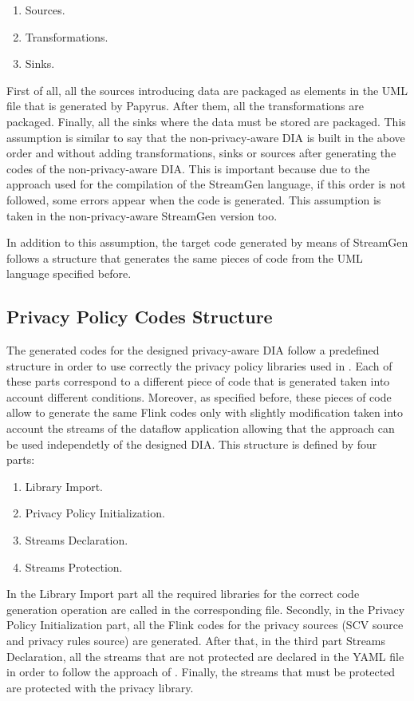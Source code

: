 \begin{enumerate}
\item Sources.
\item Transformations.
\item Sinks.
\end{enumerate}

First of all, all the sources introducing data are packaged as elements in the UML file that is generated by Papyrus. After them, all the transformations are packaged. Finally, all the sinks where the data must be stored are packaged. This assumption is similar to say that the non-privacy-aware DIA is built in the above order and without adding transformations, sinks or sources after generating the codes of the non-privacy-aware DIA. This is important because due to the approach used for the compilation of the StreamGen language, if this order is not followed, some errors appear when the code is generated. This assumption is taken in the non-privacy-aware StreamGen version too.

In addition to this assumption, the target code generated by means of StreamGen follows a structure that generates the same pieces of code from the UML language specified before.

\subsection{Privacy Policy Codes Structure}

The generated codes for the designed privacy-aware DIA follow a predefined structure in order to use correctly the privacy policy libraries used in \cite{privacypoliciesarticle}. Each of these parts correspond to a different piece of code that is generated taken into account different conditions. Moreover, as specified before, these pieces of code allow to generate the same Flink codes only with slightly modification taken into account the streams of the dataflow application allowing that the approach can be used independetly of the designed DIA. This structure is defined by four parts:

\begin{enumerate}
\item Library Import.
\item Privacy Policy Initialization.
\item Streams Declaration.
\item Streams Protection.
\end{enumerate}

In the Library Import part all the required libraries for the correct code generation operation are called in the corresponding file. Secondly, in the Privacy Policy Initialization part, all the Flink codes for the privacy sources (SCV source and privacy rules source) are generated. After that, in the third part Streams Declaration, all the streams that are not protected are declared in the YAML file in order to follow the approach of \cite{privacypoliciesarticle}. Finally, the streams that must be protected are protected with the privacy library.

